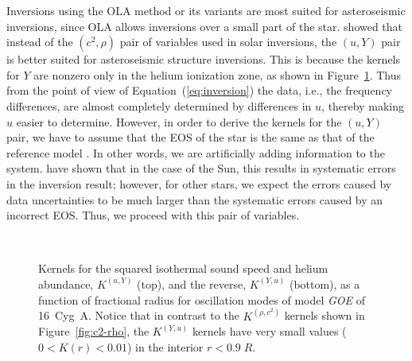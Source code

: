 Inversions using the OLA method or its variants are most suited for asteroseismic inversions, since OLA allows inversions over a small part of the star. 
\citet{2003Ap&SS.284..153B} showed that instead of the ${(c^2,\rho)}$ pair of variables used in solar inversions, the ${(u, Y)}$ pair is better suited for asteroseismic structure inversions. 
This is because the kernels for $Y$ are nonzero only in the helium ionization zone, as shown in Figure~\ref{fig:same-n-uY}. 
Thus from the point of view of Equation~(\ref{eq:inversion}) the data, i.e., the frequency differences, are almost completely determined by differences in $u$, thereby making $u$ easier to determine. 
However, in order to derive the kernels for the ${(u, Y)}$ pair, we have to assume that the EOS of the star is the same as that of the reference model \citep{1990MNRAS.244..542D, Kosovichev1999, ThompsonJCD2002}. 
In other words, we are artificially adding information to the system. 
\citet{1997A&A...322L...5B} have shown that in the case of the Sun, this results in systematic errors in the inversion result; 
however, for other stars, we expect the errors caused by data uncertainties to be much larger than the systematic errors caused by an incorrect EOS. 
Thus, we proceed with this pair of variables. 

%
%
%
\begin{figure}
    \centering
    \\
    \caption[${(u,Y)}$ kernels for 16~Cyg~A]{Kernels for the squared isothermal sound speed and helium abundance, $K^{(u, Y)}$ (top), and the reverse, $K^{(Y, u)}$ (bottom), as a function of fractional radius for oscillation modes of model \emph{GOE} of 16~Cyg~A. Notice that in contrast to the $K^{(\rho, c^2)}$ kernels shown in Figure~\ref{fig:c2-rho}, the $K^{(Y, u)}$ kernels have very small values (${0 < K(r) < 0.01}$) in the interior ${r < 0.9\; R}$. \label{fig:same-n-uY} }
\end{figure}
%
%



